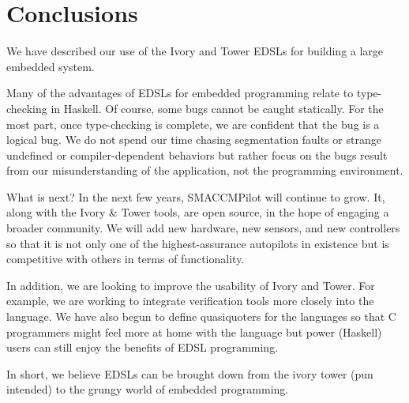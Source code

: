 \section{Conclusions}
\label{sec:conclusions}

We have described our use of the Ivory and Tower EDSLs for building a large
embedded system.

Many of the advantages of EDSLs for embedded programming relate to type-checking
in Haskell.  Of course, some bugs cannot be caught statically.  For the most part,
once type-checking is complete, we are confident that the bug is a logical bug.
We do not spend our time chasing segmentation faults or strange undefined or
compiler-dependent behaviors but rather focus on the bugs result from our
misunderstanding of the application, not the programming environment.

What is next?  In the next few years, SMACCMPilot will continue to grow. It,
along with the Ivory \& Tower tools, are open source, in the hope of engaging a
broader community.
We will add new hardware, new sensors, and new controllers so that it is not
only one of the highest-assurance autopilots in existence but is competitive
with others in terms of functionality.

In addition, we are looking to improve the usability of Ivory and Tower.  For
example, we are working to integrate verification tools more closely into the
language.  We have also begun to define quasiquoters for the languages so that
C programmers might feel more at home with the language but power (Haskell)
users can still enjoy the benefits of EDSL programming.

In short, we believe EDSLs can be brought down from the ivory tower (pun
intended) to the grungy world of embedded programming.






